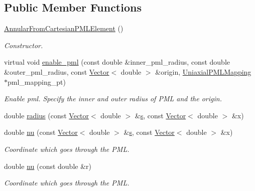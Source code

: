 \subsection*{Public Member Functions}
\begin{DoxyCompactItemize}
\item 
\hyperlink{classoomph_1_1AnnularFromCartesianPMLElement_aa54f360cf010ad8f30c3dbf27f699ae3}{Annular\+From\+Cartesian\+P\+M\+L\+Element} ()
\begin{DoxyCompactList}\small\item\em Constructor. \end{DoxyCompactList}\item 
virtual void \hyperlink{classoomph_1_1AnnularFromCartesianPMLElement_ad5ac4bafd6684b1cff949e74493aff83}{enable\+\_\+pml} (const double \&inner\+\_\+pml\+\_\+radius, const double \&outer\+\_\+pml\+\_\+radius, const \hyperlink{classoomph_1_1Vector}{Vector}$<$ double $>$ \&origin, \hyperlink{classoomph_1_1UniaxialPMLMapping}{Uniaxial\+P\+M\+L\+Mapping} $\ast$pml\+\_\+mapping\+\_\+pt)
\begin{DoxyCompactList}\small\item\em Enable pml. Specify the inner and outer radius of P\+ML and the origin. \end{DoxyCompactList}\item 
double \hyperlink{classoomph_1_1AnnularFromCartesianPMLElement_acb66a5412d96aef573a498ffc8f7a72d}{radius} (const \hyperlink{classoomph_1_1Vector}{Vector}$<$ double $>$ \&\hyperlink{cfortran_8h_ab7123126e4885ef647dd9c6e3807a21c}{s}, const \hyperlink{classoomph_1_1Vector}{Vector}$<$ double $>$ \&x)
\item 
double \hyperlink{classoomph_1_1AnnularFromCartesianPMLElement_acac12e9f2f6df3e9edebb7747ce4fab8}{nu} (const \hyperlink{classoomph_1_1Vector}{Vector}$<$ double $>$ \&\hyperlink{cfortran_8h_ab7123126e4885ef647dd9c6e3807a21c}{s}, const \hyperlink{classoomph_1_1Vector}{Vector}$<$ double $>$ \&x)
\begin{DoxyCompactList}\small\item\em Coordinate which goes through the P\+ML. \end{DoxyCompactList}\item 
double \hyperlink{classoomph_1_1AnnularFromCartesianPMLElement_a28f1b489affa8a37c0c0973cf9324157}{nu} (const double \&r)
\begin{DoxyCompactList}\small\item\em Coordinate which goes through the P\+ML. \end{DoxyCompactList}\item 

\end{DoxyCompactItemize}
